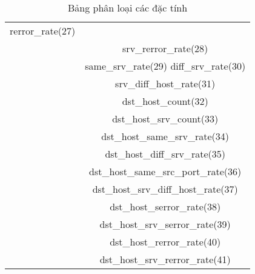 \begin{table}[!h]
\begin{center}
\begin{tabular}{ | c | c | }
			rerror\_rate(27)                                \\ &
			srv\_rerror\_rate(28)                           \\ &
			same\_srv\_rate(29)
			diff\_srv\_rate(30)                             \\ &
			srv\_diff\_host\_rate(31)                       \\ &
			dst\_host\_count(32)                            \\ &
			dst\_host\_srv\_count(33)                       \\ &
			dst\_host\_same\_srv\_rate(34)                  \\ &
			dst\_host\_diff\_srv\_rate(35)                  \\ &
			dst\_host\_same\_src\_port\_rate(36)            \\ &
			dst\_host\_srv\_diff\_host\_rate(37)            \\ &
			dst\_host\_serror\_rate(38)                     \\ &
			dst\_host\_srv\_serror\_rate(39)                \\ &
			dst\_host\_rerror\_rate(40)                     \\ &
			dst\_host\_srv\_rerror\_rate(41)                \\
			\hline
		\end{tabular}

	\end{center}
	\caption{Bảng phân loại các đặc tính}
	\label{table:1}
\end{table}
\FloatBarrier


